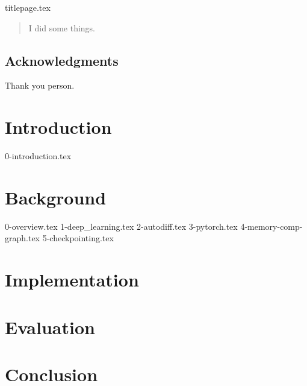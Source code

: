 \documentclass[12pt,twoside]{report}
\begin{document}
{titlepage.tex}

\clearpage{\pagestyle{empty}\cleardoublepage}
\setcounter{page}{1}
\pagestyle{fancy}

\begin{abstract}
I did some things.
\end{abstract}

\cleardoublepage
\section*{Acknowledgments}
Thank you person.

\clearpage{\pagestyle{empty}\cleardoublepage}

\tableofcontents 


\clearpage{\pagestyle{empty}\cleardoublepage}
\setcounter{page}{1}
\fancyhead[LE,RO]{\slshape \rightmark}
\fancyhead[LO,RE]{\slshape \leftmark}

\chapter{Introduction}
{0-introduction.tex}


\chapter{Background}
{0-overview.tex}
{1-deep_learning.tex}
{2-autodiff.tex}
{3-pytorch.tex}
{4-memory-comp-graph.tex}
{5-checkpointing.tex}


\chapter{Implementation}


\chapter{Evaluation}


\chapter{Conclusion}



\end{document}
